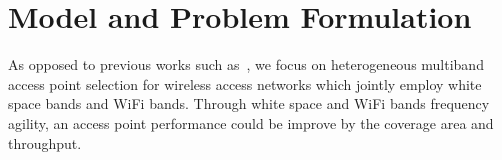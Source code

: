 %
%

\section{Model and Problem Formulation}
\label{subsec:futureproblem}

As opposed to previous works such as~\cite{franklin2007node,robinson2010deploying,si2010overview}, 
we focus on heterogeneous multiband access point selection 
for wireless access networks which jointly employ white space bands and WiFi bands.
Through white space and WiFi bands frequency agility, an access point performance could be
improve by the coverage area and throughput. 


